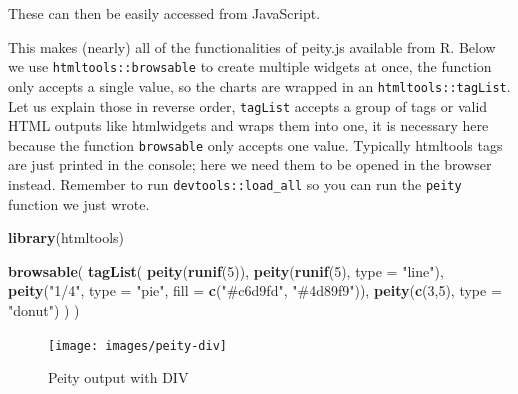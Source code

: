 \documentclass[
  10pt,
]{krantz}
\makeatletter
\newenvironment{Shaded}{\begin{snugshade}}{\end{snugshade}}
\newcommand{\AttributeTok}[1]{\textcolor[rgb]{0.61,0.61,0.61}{#1}}
\newcommand{\DataTypeTok}[1]{\textcolor[rgb]{0.27,0.27,0.27}{#1}}
\newcommand{\DecValTok}[1]{\textcolor[rgb]{0.06,0.06,0.06}{#1}}
\newcommand{\KeywordTok}[1]{\textcolor[rgb]{0.27,0.27,0.27}{\textbf{#1}}}
\newcommand{\NormalTok}[1]{#1}
\newcommand{\OperatorTok}[1]{\textcolor[rgb]{0.43,0.43,0.43}{\textbf{#1}}}
\newcommand{\StringTok}[1]{\textcolor[rgb]{0.5,0.5,0.5}{#1}}
\newcommand{\VariableTok}[1]{\textcolor[rgb]{0,0,0}{#1}}
\newenvironment{kframe}{%
\medskip{}
\setlength{\fboxsep}{.8em}
 \def\at@end@of@kframe{}%
 \ifinner\ifhmode%
  \def\at@end@of@kframe{\end{minipage}}%
  \begin{minipage}{\columnwidth}%
 \fi\fi%
 \def\FrameCommand##1{\hskip\@totalleftmargin \hskip-\fboxsep
 \colorbox{shadecolor}{##1}\hskip-\fboxsep
     \hskip-\linewidth \hskip-\@totalleftmargin \hskip\columnwidth}%
 \MakeFramed {\advance\hsize-\width
   \@totalleftmargin\z@ \linewidth\hsize
   \@setminipage}}%
 {\par\unskip\endMakeFramed%
 \at@end@of@kframe}
\renewenvironment{Shaded}{\begin{kframe}}{\end{kframe}}
\makeatother
\begin{document}
These can then be easily accessed from JavaScript.

\begin{Shaded}
\end{Shaded}

This makes (nearly) all of the functionalities of peity.js available from R. Below we use \texttt{htmltools::browsable} to create multiple widgets at once, the function only accepts a single value, so the charts are wrapped in an \texttt{htmltools::tagList}. Let us explain those in reverse order, \texttt{tagList} accepts a group of tags or valid HTML outputs like htmlwidgets and wraps them into one, it is necessary here because the function \texttt{browsable} only accepts one value. Typically htmltools tags are just printed in the console; here we need them to be opened in the browser instead. Remember to run \texttt{devtools::load\_all} so you can run the \texttt{peity} function we just wrote.

\begin{Shaded}
\begin{Highlighting}[]
\KeywordTok{library}\NormalTok{(htmltools)}

\KeywordTok{browsable}\NormalTok{(}
  \KeywordTok{tagList}\NormalTok{(}
    \KeywordTok{peity}\NormalTok{(}\KeywordTok{runif}\NormalTok{(}\DecValTok{5}\NormalTok{)),}
    \KeywordTok{peity}\NormalTok{(}\KeywordTok{runif}\NormalTok{(}\DecValTok{5}\NormalTok{), }\DataTypeTok{type =} \StringTok{"line"}\NormalTok{),}
    \KeywordTok{peity}\NormalTok{(}\StringTok{"1/4"}\NormalTok{, }\DataTypeTok{type =} \StringTok{"pie"}\NormalTok{, }\DataTypeTok{fill =} \KeywordTok{c}\NormalTok{(}\StringTok{"\#c6d9fd"}\NormalTok{, }\StringTok{"\#4d89f9"}\NormalTok{)),}
    \KeywordTok{peity}\NormalTok{(}\KeywordTok{c}\NormalTok{(}\DecValTok{3}\NormalTok{,}\DecValTok{5}\NormalTok{), }\DataTypeTok{type =} \StringTok{"donut"}\NormalTok{)}
\NormalTok{  )}
\NormalTok{)}
\end{Highlighting}
\end{Shaded}

\begin{figure}[H]

{\centering \texttt{[image: images/peity-div]} 

}

\caption{Peity output with DIV}\label{fig:peity-divs}
\end{figure}
\end{document}
